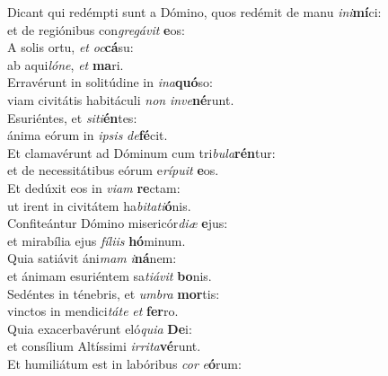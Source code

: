 \evenverse Dicant qui redémpti sunt a Dómino, quos redémit de manu \textit{i}\textit{ni}\textbf{mí}ci:~\*\\
\evenverse et de regiónibus con\textit{gre}\textit{gá}\textit{vit} \textbf{e}os:\\
\oddverse A solis ortu, \textit{et} \textit{oc}\textbf{cá}su:~\*\\
\oddverse ab aqui\textit{ló}\textit{ne}, \textit{et} \textbf{ma}ri.\\
\evenverse Erravérunt in solitúdine in \textit{i}\textit{na}\textbf{quó}so:~\*\\
\evenverse viam civitátis habitáculi \textit{non} \textit{in}\textit{ve}\textbf{né}runt.\\
\oddverse Esuriéntes, et \textit{si}\textit{ti}\textbf{én}tes:~\*\\
\oddverse ánima eórum in \textit{i}\textit{psis} \textit{de}\textbf{fé}cit.\\
\evenverse Et clamavérunt ad Dóminum cum tri\textit{bu}\textit{la}\textbf{rén}tur:~\*\\
\evenverse et de necessitátibus eórum e\textit{rí}\textit{pu}\textit{it} \textbf{e}os.\\
\oddverse Et dedúxit eos in \textit{vi}\textit{am} \textbf{re}ctam:~\*\\
\oddverse ut irent in civitátem ha\textit{bi}\textit{ta}\textit{ti}\textbf{ó}nis.\\
\evenverse Confiteántur Dómino misericór\textit{di}\textit{æ} \textbf{e}jus:~\*\\
\evenverse et mirabília ejus \textit{fí}\textit{li}\textit{is} \textbf{hó}minum.\\
\oddverse Quia satiávit áni\textit{mam} \textit{i}\textbf{ná}nem:~\*\\
\oddverse et ánimam esuriéntem sa\textit{ti}\textit{á}\textit{vit} \textbf{bo}nis.\\
\evenverse Sedéntes in ténebris, et \textit{um}\textit{bra} \textbf{mor}tis:~\*\\
\evenverse vinctos in mendici\textit{tá}\textit{te} \textit{et} \textbf{fer}ro.\\
\oddverse Quia exacerbavérunt eló\textit{qui}\textit{a} \textbf{De}i:~\*\\
\oddverse et consílium Altíssimi \textit{ir}\textit{ri}\textit{ta}\textbf{vé}runt.\\
\evenverse Et humiliátum est in labóribus \textit{cor} \textit{e}\textbf{ó}rum:~\*\\
